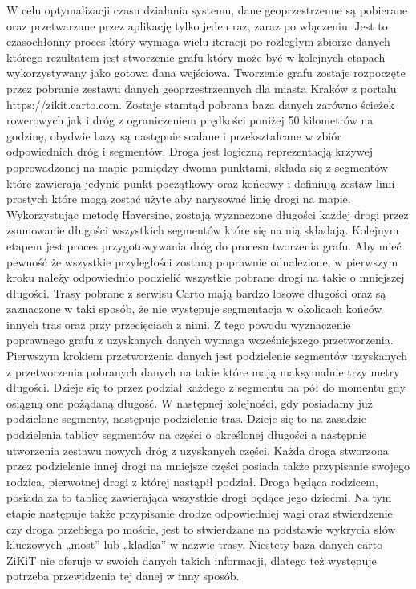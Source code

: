 W celu optymalizacji czasu działania systemu, dane geoprzestrzenne są pobierane oraz przetwarzane przez aplikację tylko jeden raz, zaraz po włączeniu. Jest to czasochłonny proces który wymaga wielu iteracji po rozległym zbiorze danych którego rezultatem jest stworzenie grafu który może być w kolejnych etapach wykorzystywany jako gotowa dana wejściowa. Tworzenie grafu zostaje rozpoczęte przez pobranie zestawu danych geoprzestrzennych dla miasta Kraków z portalu https://zikit.carto.com. Zostaje stamtąd pobrana baza danych zarówno ścieżek rowerowych jak i dróg z ograniczeniem prędkości poniżej 50 kilometrów na godzinę, obydwie bazy są następnie scalane i przekształcane w zbiór odpowiednich dróg i segmentów. Droga jest logiczną reprezentacją krzywej poprowadzonej na mapie pomiędzy dwoma punktami, składa się z segmentów które zawierają jedynie punkt początkowy oraz końcowy i definiują zestaw linii prostych które mogą zostać użyte aby narysować linię drogi na mapie. Wykorzystując metodę Haversine, zostają wyznaczone długości każdej drogi przez zsumowanie długości wszystkich segmentów które się na nią składają. 
Kolejnym etapem jest proces przygotowywania dróg do procesu tworzenia grafu. Aby mieć pewność że wszystkie przyległości zostaną poprawnie odnalezione, w pierwszym kroku należy odpowiednio podzielić wszystkie pobrane drogi na takie o mniejszej długości. Trasy pobrane z serwisu Carto mają bardzo losowe długości oraz są zaznaczone w taki sposób, że nie występuje segmentacja w okolicach końców innych tras oraz przy przecięciach z nimi. Z tego powodu wyznaczenie poprawnego grafu z uzyskanych danych wymaga wcześniejszego przetworzenia. Pierwszym krokiem przetworzenia danych jest podzielenie segmentów uzyskanych z przetworzenia pobranych danych na takie które mają maksymalnie trzy metry długości. Dzieje się to przez podział każdego z segmentu na pół do momentu gdy osiągną one pożądaną długość. W następnej kolejności, gdy posiadamy już podzielone segmenty, następuje podzielenie tras. Dzieje się to na zasadzie podzielenia tablicy segmentów na części o określonej długości a następnie utworzenia zestawu nowych dróg z uzyskanych części. Każda droga stworzona przez podzielenie innej drogi na mniejsze części posiada także przypisanie swojego rodzica, pierwotnej drogi z której nastąpił podział. Droga będąca rodzicem, posiada za to tablicę zawierająca wszystkie drogi będące jego dziećmi. Na tym etapie następuje także przypisanie drodze odpowiedniej wagi oraz stwierdzenie czy droga przebiega po moście, jest to stwierdzane na podstawie wykrycia słów kluczowych „most” lub „kladka” w nazwie trasy. Niestety baza danych carto ZiKiT nie oferuje w swoich danych takich informacji, dlatego też występuje potrzeba przewidzenia tej danej w inny sposób. 
